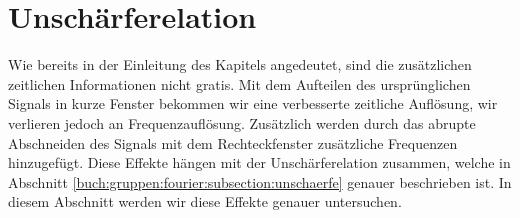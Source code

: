 %
%
%
%
\section{Unschärferelation
\label{sonogramm:section:teil1}}
Wie bereits in der Einleitung des Kapitels angedeutet, sind die zusätzlichen
zeitlichen Informationen nicht gratis. 
Mit dem Aufteilen des ursprünglichen Signals in kurze Fenster bekommen wir eine
verbesserte zeitliche Auflösung, wir verlieren jedoch an Frequenzauflösung.
Zusätzlich werden durch das abrupte Abschneiden des Signals mit dem Rechteckfenster
zusätzliche Frequenzen hinzugefügt. 
Diese Effekte hängen mit der Unschärferelation zusammen, welche in Abschnitt
%
\ref{buch:gruppen:fourier:subsection:unschaerfe} genauer beschrieben ist.
In diesem Abschnitt werden wir diese Effekte genauer untersuchen.
